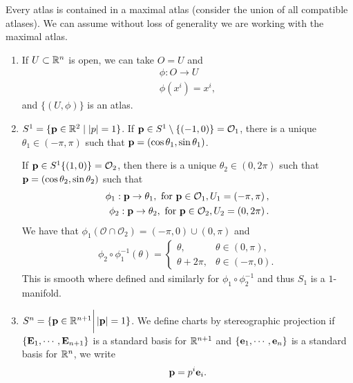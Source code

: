 Every atlas is contained in a maximal atlas (consider the union of all compatible atlases). We can assume without loss of generality we are working with the maximal atlas.

\begin{examples}
    \begin{enumerate}[label=\roman*)]
        \item If $U \subset \mathbb{R}^{n}$ is open, we can take $O = U$ and
            \begin{align}
                \phi : O \to U \\
                \phi \left( x^{i} \right) = x^{i}
            ,\end{align}
            and $\{\left( U,\phi \right) \} $ is an atlas.
        \item $S^{1} = \{ \vb{p} \in \mathbb{R}^{2}  \mid  \left| p \right| = 1\} $.
            If $\vb{p} \in S^{1} \setminus \{ \left( -1,0 \right) \} = \mathcal{O}_1$, there is a unique $\theta_1 \in \left( -\pi, \pi \right) $ such that $\vb{p} = \left( \cos \theta_1, \sin \theta_1 \right) $.

            If $\vb{p} \in S^{1} \{\left( 1,0 \right) \} = \mathcal{O}_2$, then there is a unique $\theta_2 \in \left( 0, 2\pi \right) $ such that $\vb{p} = \left( \cos \theta_2, \sin \theta_2 \right) $ such that
            \begin{align}
                \phi_1 : \vb{p} \to \theta_1, \text{~for~} \vb{p} \in \mathcal{O}_1, U_1 = \left( -\pi, \pi \right), \\
                \phi_2 : \vb{p} \to \theta_2, \text{~for~} \vb{p} \in \mathcal{O}_2, U_2 = \left( 0,2\pi \right)
            .\end{align}
            We have that $\phi_1 \left( \mathcal{O} \cap \mathcal{O}_2 \right) = \left( -\pi,0 \right) \cup \left( 0,\pi \right) $ and 
            \begin{align}
                \phi_2 \circ \phi_1^{-1} \left( \theta \right) = \begin{cases}
                    \theta, & \theta \in \left( 0, \pi \right),\\
                    \theta + 2\pi , & \theta \in \left( -\pi,0 \right) .
                \end{cases}
            \end{align}
            This is smooth where defined and similarly for $\phi_1 \circ \phi_2^{-1}$ and thus $S_1$ is a $1$-manifold.
        \item $S^{n} = \{\vb{p} \in \mathbb{R}^{n+1}  \bigg|  \left| \vb{p} \right| = 1\} $.
            We define charts by stereographic projection if $\{\vb{E}_1, \cdots , \vb{E}_{n+1}\} $ is a standard basis for $\mathbb{R}^{n+1}$ and $\{\vb{e}_1, \cdots, \vb{e}_{n}\} $ is a standard basis for $\mathbb{R}^{n}$, we write
            \begin{align}
                \vb{p} = p^{i}\vb{e}_{i}
            .\end{align}


\end{enumerate}
\end{examples}
